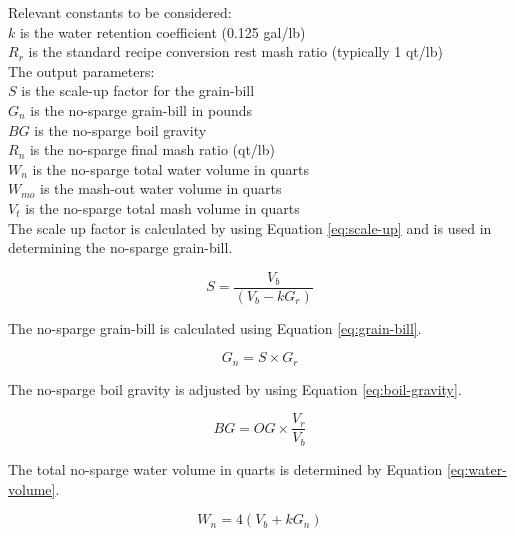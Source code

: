 \documentclass{article}
\begin{document}
\noindent Relevant constants to be considered: \\
$k$ is the water retention coefficient (0.125 gal/lb) \\
$R_{r}$ is the standard recipe conversion rest \gls{mash} ratio (typically 1 qt/lb) \\

\noindent The output parameters: \\
$S$ is the scale-up factor for the \gls{grain-bill} \\
$G_{n}$ is the no-\gls{sparge} \gls{grain-bill} in pounds \\
$BG$ is the no-\gls{sparge} boil \gls{gravity} \\
$R_{n}$ is the no-\gls{sparge} final \gls{mash} ratio (qt/lb) \\
$W_{n}$ is the no-\gls{sparge} total water volume in quarts \\
$W_{mo}$ is the \gls{mash}-out water volume in quarts \\
$V_{t}$ is the no-\gls{sparge} total \gls{mash} volume in quarts \\

\noindent The scale up factor is calculated by using Equation \ref{eq:scale-up} and is used in determining the no-\gls{sparge} \gls{grain-bill}.

\begin{equation}
S = \frac{V_{b}}{(V_{b} - kG_{r})}
\label{eq:scale-up}
\end{equation}

\noindent The no-\gls{sparge} \gls{grain-bill} is calculated using Equation \ref{eq:grain-bill}.

\begin{equation}
G_{n} = S \times G_{r}
\label{eq:grain-bill}
\end{equation}

\noindent The no-\gls{sparge} boil \gls{gravity} is adjusted by using Equation \ref{eq:boil-gravity}.

\begin{equation}
BG = OG \times \frac{V_{r}}{V_{b}}
\label{eq:boil-gravity}
\end{equation}

\noindent The total no-\gls{sparge} water volume in quarts is determined by Equation \ref{eq:water-volume}.

\begin{equation}
W_{n} = 4(V_{b} + kG_{n})
\label{eq:water-volume}
\end{equation}
\end{document}
